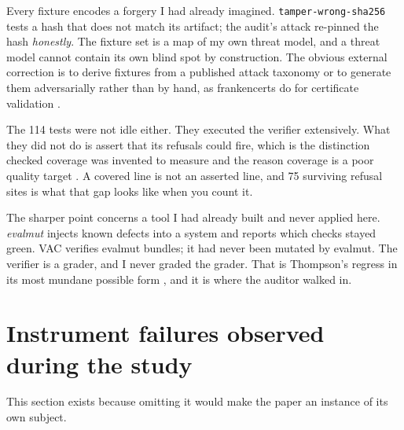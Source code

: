 \documentclass[11pt]{article}
\newcommand{\vacname}{VAC}
\begin{document}
Every fixture encodes a forgery I had already imagined. \texttt{tamper-wrong-sha256} tests a
hash that does not match its artifact; the audit's attack re-pinned the hash \emph{honestly}.
The fixture set is a map of my own threat model, and a threat model cannot contain its own
blind spot by construction. The obvious external correction is to derive fixtures from a
published attack taxonomy \citep{ladisa2023sok} or to generate them adversarially rather
than by hand, as frankencerts do for certificate validation
\citep{brubaker2014frankencerts}.

The 114 tests were not idle either. They executed the verifier extensively. What they did not
do is assert that its refusals could fire, which is the distinction checked coverage was
invented to measure \citep{schuler2011checkedcov} and the reason coverage is a poor quality
target \citep{inozemtseva2014coverage}. A covered line is not an asserted line, and 75
surviving refusal sites is what that gap looks like when you count it.

The sharper point concerns a tool I had already built and never applied here. \emph{evalmut}
injects known defects into a system and reports which checks stayed green. \vacname{}
verifies evalmut bundles; it had never been mutated by evalmut. The verifier is a grader, and I never graded the grader. That is Thompson's regress
in its most mundane possible form \citep{thompson1984trusting}, and it is where the auditor
walked in.

\section{Instrument failures observed during the study}
\label{sec:instruments}

This section exists because omitting it would make the paper an instance of its own subject.
\end{document}

